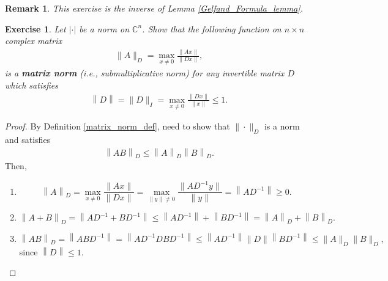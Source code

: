 \documentclass[11pt]{book}
\newtheorem{exercise}{Exercise}[section]
\newtheorem{remark}{Remark}[chapter]
\theoremstyle{definition}
\numberwithin{equation}{chapter}
\begin{document}
\begin{remark}
This exercise is the inverse of Lemma \ref{Gelfand_Formula_lemma}.
\end{remark}

\medskip

\begin{exercise}
Let $|\cdot|$ be a norm on $\mathbb{C}^n$. Show that the following function on $n \times n$ complex matrix
\begin{align*}
    \|A\|_D = \max_{x \neq 0} \frac{\|Ax\|}{\|Dx\|},
\end{align*}
is a {\bf matrix norm} (i.e., submultiplicative norm) for any invertible matrix $D$ which satisfies 
\begin{align*}
    \left\|D\right\| = \|D\|_I = \max_{x\neq 0} \frac{\|Dx\|}{\|x\|} \leq 1.
\end{align*}
\end{exercise}
\begin{proof}
By Definition \ref{matrix_norm_def}, need to show that $\|\cdot \|_D$ is a norm and satisfies
\begin{align*}
    \left\|AB\right\|_D \leq \left\|A\right\|_D \left\|B\right\|_D.
\end{align*}
Then,
\begin{enumerate}[label=(\alph*)]
    \item $$\left\|A\right\|_D = \max_{x \neq 0} \frac{\|Ax\|}{\|Dx\|} = \max_{\|y\|\neq 0} \frac{\|AD^{-1}y\|}{\|y\|} = \left\|AD^{-1}\right\| \geq 0.$$
    
    \item $$\left\|A + B\right\|_D = \left\|AD^{-1} + BD^{-1}\right\| \leq \left\|AD^{-1}\right\| + \left\|BD^{-1}\right\| = \left\|A\right\|_D + \left\|B\right\|_D.$$
    
    \item $$\left\|AB\right\|_D = \left\|ABD^{-1}\right\| = \left\|AD^{-1}DBD^{-1}\right\| \leq \left\|AD^{-1}\right\| \|D\| \left\|BD^{-1}\right\| \leq \|A\|_D \|B\|_D,$$ 
    since $\left\|D\right\| \leq 1$.
\end{enumerate}
\end{proof}

\medskip
\end{document}
